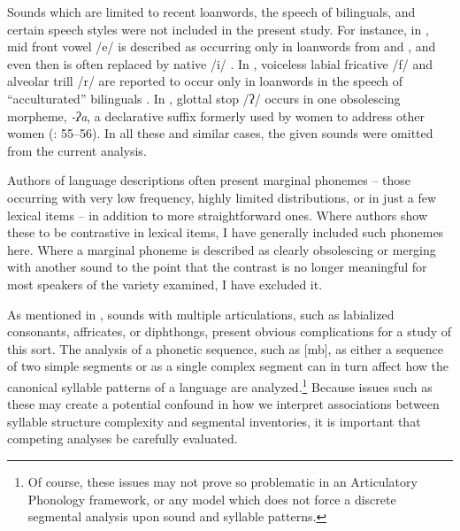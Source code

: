   Sounds which are limited to recent loanwords, the speech of bilinguals, and certain speech styles were not included in the present study. For instance, in , mid front vowel /e/ is described as occurring only in loanwords from  and , and even then is often replaced by native /i/ \citep[26]{Crawford1966}. In , voiceless labial fricative /f/ and alveolar trill /r/ are reported to occur only in loanwords in the speech of ``acculturated''  bilinguals \citep[13]{Kaufman1971}. In , glottal stop /ʔ/ occurs in one obsolescing morpheme, \textit{-ʔa}, a declarative suffix formerly used by women to address other women (\citealt{Cerrón-Palomino2006}: 55--56). In all these and similar cases, the given sounds were omitted from the current analysis.

  Authors of language descriptions often present marginal phonemes -- those occurring with very low frequency, highly limited distributions, or in just a few lexical items -- in addition to more straightforward ones. Where authors show these to be contrastive in lexical items, I have generally included such phonemes here. Where a marginal phoneme is described as clearly obsolescing or merging with another sound to the point that the contrast is no longer meaningful for most speakers of the variety examined, I have excluded it.

  As mentioned in , sounds with multiple articulations, such as labialized consonants, affricates, or diphthongs, present obvious complications for a study of this sort. The analysis of a phonetic sequence, such as [mb], as either a sequence of two simple segments or as a single complex segment can in turn affect how the canonical syllable patterns of a language are analyzed.\footnote{{Of course, these issues may not prove so problematic in an Articulatory Phonology framework, or any model which does not force a discrete segmental analysis upon sound and syllable patterns.}} Because issues such as these may create a potential confound in how we interpret associations between syllable structure complexity and segmental inventories, it is important that competing analyses be carefully evaluated. 

